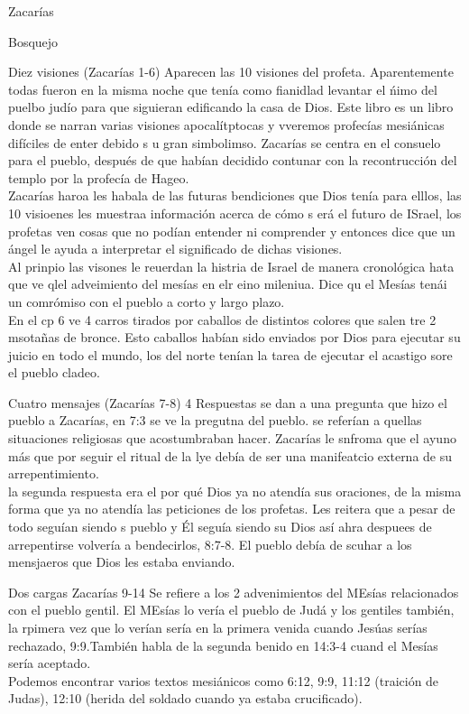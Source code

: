 \documentclass[12pt]{article}
\begin{document}
\begin{section}{Zacarías}
\begin{subsection}{Bosquejo}
		\begin{subsubsection}{Diez visiones (Zacarías 1-6)}
			Aparecen las 10 visiones del profeta. Aparentemente todas fueron en la misma noche que tenía como fianidlad levantar el ńimo del puelbo judío para que siguieran edificando la casa de Dios. Este libro es un libro donde se narran varias visiones apocalítptocas y vveremos profecías mesiánicas difíciles de enter debido s u gran simbolimso. Zacarías se centra en el consuelo para el pueblo, después de que habían decidido contunar con la recontrucción del templo por la profecía de Hageo.\\
			Zacarías haroa les habala de las futuras bendiciones que Dios tenía para elllos, las 10 visioenes les muestraa información acerca de cómo s erá el futuro de ISrael, los profetas ven cosas que no podían entender ni comprender y entonces dice que un ángel le ayuda a interpretar el significado de dichas visiones.\\
			Al prinpio las visones le reuerdan la histria de Israel de manera cronológica hata que ve qlel adveimiento del mesías en elr eino mileniua. Dice qu el Mesías tenái un comrómiso con el pueblo a corto y largo plazo.\\
			En el cp 6 ve 4 carros tirados por caballos de distintos colores que salen tre 2 msotañas de bronce. Esto caballos habían sido enviados por Dios para ejecutar su juicio en todo el mundo, los del norte tenían la tarea de ejecutar el acastigo sore el pueblo cladeo.
		\end{subsubsection}
		\begin{subsubsection}{Cuatro mensajes (Zacarías 7-8)}
			4 Respuestas se dan a una pregunta que hizo el pueblo a Zacarías, en 7:3 se ve la pregutna del pueblo. se referían a quellas situaciones religiosas que acostumbraban hacer. Zacarías le snfroma que el ayuno más que por seguir el ritual de la lye debía de ser una manifeatcio  externa de su arrepentimiento.\\
			la segunda respuesta era el por qué Dios ya no atendía sus oraciones, de la misma forma que ya no atendía las peticiones de los profetas. Les reitera que a pesar de todo seguían siendo s pueblo y Él seguía siendo su Dios así ahra despuees de arrepentirse volvería a bendecirlos, 8:7-8. El pueblo debía de scuhar a los mensjaeros que Dios les estaba enviando.
		\end{subsubsection}
		\begin{subsubsection}{Dos cargas Zacarías 9-14}
			Se refiere a los 2 advenimientos del MEsías relacionados con el pueblo gentil. El MEsías lo vería el pueblo de Judá y los gentiles también, la rpimera vez que lo verían sería en la primera venida cuando Jesúas serías rechazado, 9:9.También habla de la segunda benido en 14:3-4 cuand el Mesías sería aceptado.\\
			Podemos encontrar varios textos mesiánicos como 6:12, 9:9, 11:12 (traición de Judas), 12:10 (herida del soldado cuando ya estaba crucificado).
		\end{subsubsection}
	\end{subsection}
\end{section}
\end{document}
